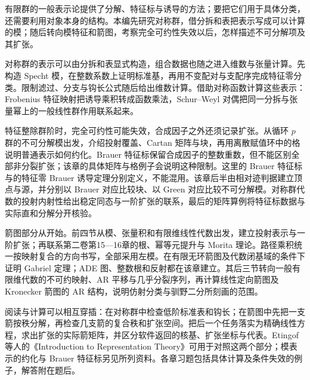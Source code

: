 
\BookPartGuide
有限群的一般表示论提供了分解、特征标与诱导的方法；要把它们用于具体分类，还需要利用对象本身的结构。本编先研究对称群，借分拆和表把表示写成可以计算的模；随后转向模特征和箭图，考察完全可约性失效以后，怎样描述不可分解项及其扩张。

\ProseParagraphBreak
对称群的表示可以由分拆和表显式构造，组合数据也随之进入维数与张量计算。先构造 Specht 模，在整数系数上证明标准基，再用不变配对与支配序完成特征零分类。限制滤过、分支与钩长公式随后给出维数计算。借助对称函数计算这些表示：Frobenius 特征映射把诱导乘积转成函数乘法，Schur--Weyl 对偶把同一分拆与张量幂上的一般线性群作用联系起来。

\ProseParagraphBreak
特征整除群阶时，完全可约性可能失效，合成因子之外还须记录扩张。从循环 \(p\) 群的不可分解模出发，介绍投射覆盖、Cartan 矩阵与块，再用离散赋值环中的格说明普通表示如何约化。Brauer 特征标保留合成因子的整数重数，但不能区别全部非分裂扩张；该章的具体矩阵与格例子会说明这种限制。这里的 Brauer 特征标与的特征零 Brauer 诱导定理分别定义，不能混用。该章后半由相对迹判据建立顶点与源，并分别以 Brauer 对应比较块、以 Green 对应比较不可分解模。对称群代数的投射内射性给出稳定同态与一阶扩张的联系，最后的矩阵算例将特征标数据与实际直和分解分开核验。

\ProseParagraphBreak
箭图部分从开始。前四节从模、张量积和有限维线性代数出发，建立投射表示与一阶扩张；再联系第二卷第15—16章的根、幂等元提升与 Morita 理论。路径乘积统一按映射复合的方向书写，全部采用左模。在有限无环箭图及代数闭基域的条件下证明 Gabriel 定理；ADE 图、整数根和反射都在该章建立。其后三节转向一般有限维代数的不可约映射、AR 平移与几乎分裂序列，再计算线性定向箭图及 Kronecker 箭图的 AR 结构，说明仿射分类与驯野二分所刻画的范围。

\ProseParagraphBreak
阅读与计算可以相互穿插：在对称群中检查低阶标准表和钩长；在箭图中先把一支箭按秩分解，再检查几支箭的复合秩和扩张空间。把后一个任务落实为精确线性方程，求出扩张的实际箭矩阵，并区分软件返回的核基、扩张坐标与代表。Etingof 等人的《Introduction to Representation Theory》\cite[Sections 5.12--5.23; Chapter 6]{EtingofEtAl2011RepresentationTheory}可用于对照这两个部分；模表示的约化与 Brauer 特征标另见所列资料。各章习题包括具体计算及条件失效的例子，解答附在题后。






